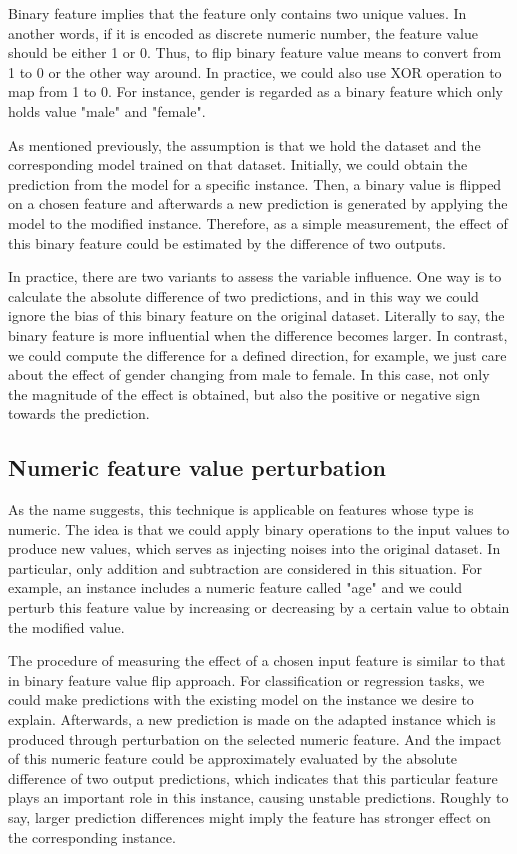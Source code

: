 Binary feature implies that the feature only contains two unique values. In another words, if it is encoded as discrete numeric number, the feature value should be either 1 or 0. Thus, to flip binary feature value means to convert from 1 to 0 or the other way around. In practice, we could also use XOR operation to map from 1 to 0. For instance, gender is regarded as a binary feature which only holds value "male" and "female". 

As mentioned previously, the assumption is that we hold the dataset and the corresponding model trained on that dataset. Initially, we could obtain the prediction from the model for a specific instance. Then, a binary value is flipped on a chosen feature and afterwards a new prediction is generated by applying the model to the modified instance. Therefore, as a simple measurement, the effect of this binary feature could be estimated by the difference of two outputs. 

In practice, there are two variants to assess the variable influence. One way is to calculate the absolute difference of two predictions, and in this way we could ignore the bias of this binary feature on the original dataset. Literally to say, the binary feature is more influential when the difference becomes larger. In contrast, we could compute the difference for a defined direction, for example, we just care about the effect of gender changing from male to female. In this case, not only the magnitude of the effect is obtained, but also the positive or negative sign towards the prediction.  

\subsection{Numeric feature value perturbation}

As the name suggests, this technique is applicable on features whose type is numeric. The idea is that we could apply binary operations to the input values to produce new values, which serves as injecting noises into the original dataset. In particular, only addition and subtraction are considered in this situation. For example, an instance includes a numeric feature called "age" and we could perturb this feature value by increasing or decreasing by a certain value to obtain the modified value. 

The procedure of measuring the effect of a chosen input feature is similar to that in binary feature value flip approach. For classification or regression tasks, we could make predictions with the existing model on the instance we desire to explain. Afterwards, a new prediction is made on the adapted instance which is produced through perturbation on the selected numeric feature. And the impact of this numeric feature could be approximately evaluated by the absolute difference of two output predictions, which indicates that this particular feature plays an important role in this instance, causing unstable predictions. Roughly to say, larger prediction differences might imply the feature has stronger effect on the corresponding instance. 


